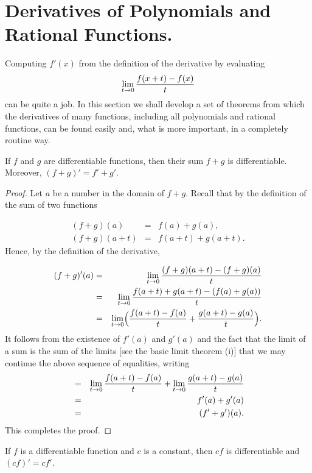\section{Derivatives of Polynomials and Rational Functions.}\label{sec 1.7} 
Computing $f'(x)$ from the definition of the derivative
by evaluating 
\[
\lim_{t \rightarrow 0} \frac{f(x + t) - f (x)}{t}
\]
can be quite a job.
In this section we shall develop a set of theorems
from which the derivatives of many functions,
including all polynomials and rational functions,
can be found easily and, what is more important,
in a completely routine way.

\begin{prop}\label{thm 1.7.1}
If $f$ and $g$ are differentiable functions,
then their sum $f + g$ is differentiable.
Moreover, $(f + g)' = f' + g'$.
\end{prop}

\begin{proof}
Let $a$ be a number in the domain of $f + g$.
Recall that by the definition of the sum of two functions

\begin{eqnarray*}
     (f + g)(a) &=& f(a) + g(a),   \\
(f + g)(a + t) &=& f(a + t) + g(a + t).
\end{eqnarray*}
Hence, by the definition of the derivative,

\begin{eqnarray*} 
(f + g)'(a)
&=&
\lim_{t \rightarrow 0} \frac{(f + g)(a + t) - (f + g)(a)}{t} \\
&=&
\lim_{t \rightarrow 0} \frac{f(a + t) + g(a + t) - (f(a) + g(a))}{t}\\
&=&
\lim_{t \rightarrow 0}
\Bigl( \frac{f(a + t) - f(a)}{t} + \frac{g(a + t) - g(a)}{t} \Bigr).
\end{eqnarray*}
It follows from the existence of $f'(a)$ and $g'(a)$
and the fact that the limit of a sum is the sum of the limits
[see the basic limit theorem (i)]
that we may continue the above sequence of equalities,
writing
\begin{eqnarray*}
&=& \lim_{t \rightarrow 0} {\frac {f(a + t) - f(a)}{t} } + \lim_{t \rightarrow 0} { \frac{g(a + t) - g(a)}{t} }  \\ 
&=& f'(a) + g'(a)  \\
&=& (f' + g')(a).
\end{eqnarray*}
This completes the proof.
\end{proof}

\begin{prop}\label{thm 1.7.2}
If $f$ is a differentiable function
and $c$ is a constant,
then $cf$ is differentiable and $(cf)' = cf'$.
\end{prop}

